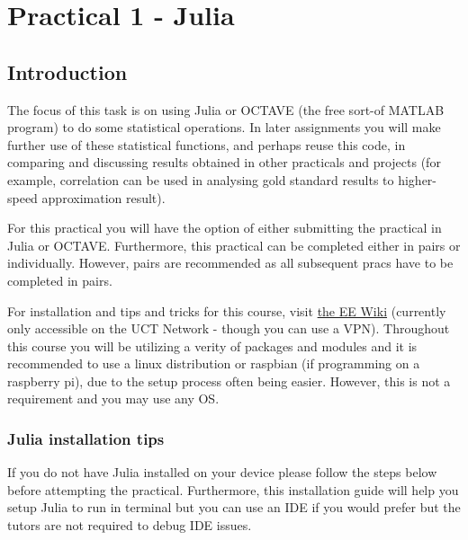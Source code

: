 \section{Practical 1 - Julia}

\label{sec:Prac1}
\subsection{Introduction}
The focus of this task is on using Julia or OCTAVE (the free sort-of MATLAB program) to do some statistical operations. In later assignments you will make further use of these statistical functions, and perhaps reuse this code, in comparing and discussing results obtained in other practicals and projects (for example, correlation can be used in analysing gold standard results to higher-speed approximation result).

For this practical you will have the option of either submitting the practical in Julia or OCTAVE. Furthermore, this practical can be completed either in pairs or individually. However, pairs are recommended as all subsequent pracs have to be completed in pairs. 

For installation and tips and tricks for this course, visit \href{http://wiki.ee.uct.ac.za}{the EE Wiki} (currently only accessible on the UCT Network - though you can use a VPN). Throughout this course you will be utilizing a verity of packages and modules and it is recommended to use a linux distribution or raspbian (if programming on a raspberry pi), due to the setup process often being easier. However, this is not a requirement and you may use any OS.

\subsubsection{Julia installation tips}
If you do not have Julia installed on your device please follow the steps below before attempting the practical. Furthermore, this installation guide will help you setup Julia to run in terminal but you can use an IDE if you would prefer but the tutors are not required to debug IDE issues. 

